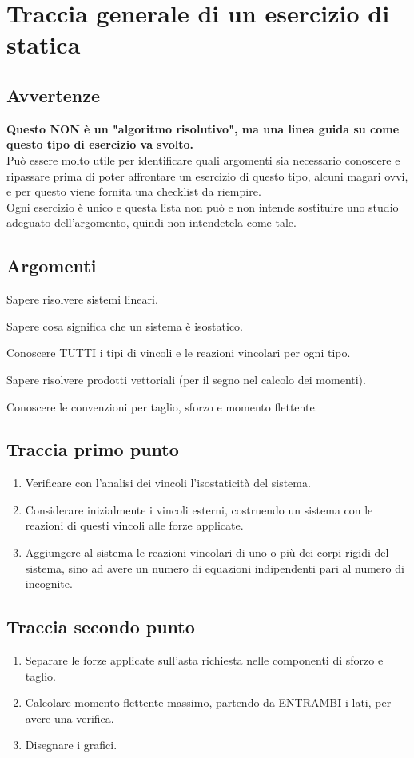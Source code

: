 \documentclass[main.tex]{subfiles}
\begin{document}
\section{Traccia generale di un esercizio di statica}

\subsection{Avvertenze}
\textbf{Questo NON è un "algoritmo risolutivo", ma una linea guida su come questo tipo di esercizio va svolto.}
\\
Può essere molto utile per identificare quali argomenti sia necessario conoscere e ripassare prima di poter affrontare un esercizio di questo tipo, alcuni magari ovvi, e per questo viene fornita una checklist da riempire.
\\
Ogni esercizio è unico e questa lista non può e non intende sostituire uno studio adeguato dell'argomento, quindi non intendetela come tale.

\subsection{Argomenti}
\begin{todolist}
\item Sapere risolvere sistemi lineari.
\item Sapere cosa significa che un sistema è isostatico.
\item Conoscere TUTTI i tipi di vincoli e le reazioni vincolari per ogni tipo.
\item Sapere risolvere prodotti vettoriali (per il segno nel calcolo dei momenti).
\item Conoscere le convenzioni per taglio, sforzo e momento flettente.
\end{todolist}

\subsection{Traccia primo punto}
\begin{enumerate}
\item Verificare con l'analisi dei vincoli l'isostaticità del sistema.
\item Considerare inizialmente i vincoli esterni, costruendo un sistema con le reazioni di questi vincoli alle forze applicate.
\item Aggiungere al sistema le reazioni vincolari di uno o più dei corpi rigidi del sistema, sino ad avere un numero di equazioni indipendenti pari al numero di incognite.
\end{enumerate}

\subsection{Traccia secondo punto}
\begin{enumerate}
\item Separare le forze applicate sull'asta richiesta nelle componenti di sforzo e taglio.
\item Calcolare momento flettente massimo, partendo da ENTRAMBI i lati, per avere una verifica.
\item Disegnare i grafici.
\end{enumerate}
\end{document}
